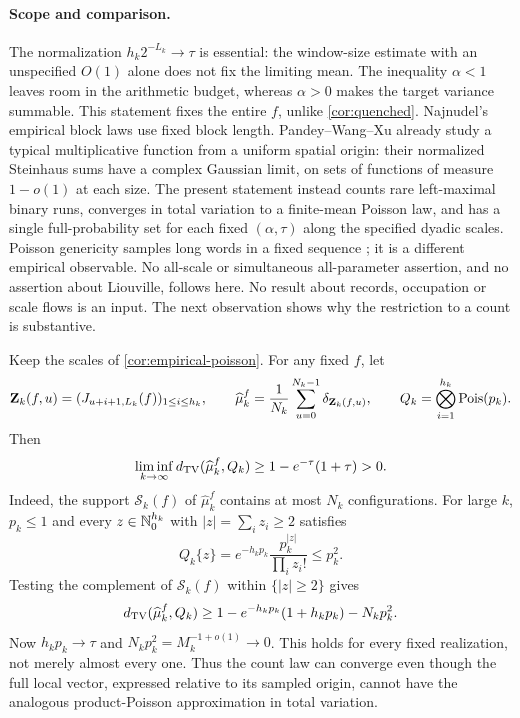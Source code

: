 \paragraph{Scope and comparison.}
The normalization $h_k2^{-L_k}\to\tau$ is essential: the window-size
estimate with an unspecified $O(1)$ alone does not fix the limiting
mean. The inequality $\alpha<1$ leaves room in the arithmetic budget,
whereas $\alpha>0$ makes the target variance summable. This statement
fixes the entire $f$, unlike \cref{cor:quenched}. Najnudel's empirical
block laws \cite{Najnudel2020} use fixed block length.
Pandey--Wang--Xu \cite[arXiv version 4, Theorem~1.2 and footnote~1]{PandeyWangXu2024}
already study a typical multiplicative function from a uniform spatial
origin: their normalized Steinhaus sums have a complex Gaussian limit,
on sets of functions of measure $1-o(1)$ at each size. The present
statement instead counts rare left-maximal binary runs, converges in
total variation to a finite-mean Poisson law, and has a single
full-probability set for each fixed $(\alpha,\tau)$ along the specified
dyadic scales. Poisson genericity samples long words in a fixed sequence
\cite{AlvarezBecherMereb2023,AlvarezEtAlPoissonGenericity}; it is a different empirical
observable. No all-scale or simultaneous all-parameter assertion, and no
assertion about Liouville, follows here. No result about records,
occupation or scale flows is an input. The next observation shows why
the restriction to a count is substantive.

\begin{empiricalobstruction}
\label{rem:empirical-field-obstruction}
Keep the scales of \cref{cor:empirical-poisson}. For any fixed $f$, let
\[
 \mathbf Z_k(f,u)=(J_{u+i+1,L_k}(f))_{1\le i\le h_k},\qquad
 \widehat\mu_k^f=\frac1{N_k}\sum_{u=0}^{N_k-1}\delta_{\mathbf Z_k(f,u)},
 \qquad Q_k=\bigotimes_{i=1}^{h_k}\operatorname{Pois}(p_k).
\]
Then
\[
 \liminf_{k\to\infty}d_{\mathrm{TV}}(\widehat\mu_k^f,Q_k)
       \ge 1-e^{-\tau}(1+\tau)>0.
\]
Indeed, the support $\mathscr S_k(f)$ of $\widehat\mu_k^f$ contains at
most $N_k$ configurations. For large $k$, $p_k\le1$ and every
$z\in\mathbb N_0^{h_k}$ with $|z|=\sum_i z_i\ge2$ satisfies
\[
 Q_k\{z\}=e^{-h_kp_k}\frac{p_k^{|z|}}{\prod_i z_i!}\le p_k^2.
\]
Testing the complement of $\mathscr S_k(f)$ within $\{|z|\ge2\}$ gives
\[
 d_{\mathrm{TV}}(\widehat\mu_k^f,Q_k)
 \ge 1-e^{-h_kp_k}(1+h_kp_k)-N_kp_k^2.
\]
Now $h_kp_k\to\tau$ and $N_kp_k^2=M_k^{-1+o(1)}\to0$.
This holds for every fixed realization, not merely almost every one.
Thus the count law can converge even though the full local vector,
expressed relative to its sampled origin, cannot have the analogous
product-Poisson approximation in total variation.
\end{empiricalobstruction}
